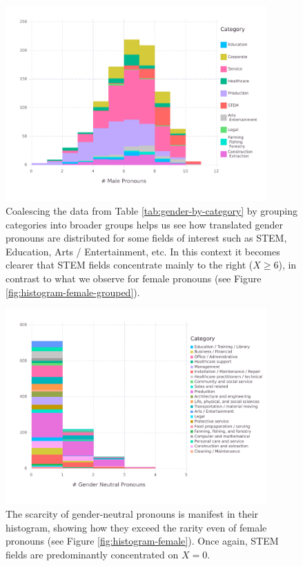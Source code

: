 \documentclass[fleqn,10pt]{article}
\begin{document}
\begin{figure}[H]
	\centering
	\includegraphics[width=10cm]{pictures/histogram-male-grouped}
	\caption{Coalescing the data from Table \ref{tab:gender-by-category} by grouping categories into broader groups helps us see how translated gender pronouns are distributed for some fields of interest such as STEM, Education, Arts / Entertainment, etc. In this context it becomes clearer that STEM fields concentrate mainly to the right ($X \geq 6$), in contrast to what we observe for female pronouns (see Figure \ref{fig:histogram-female-grouped}).}
	\label{fig:histogram-male-grouped}
\end{figure}

\begin{figure}[H]
	\centering
	\includegraphics[width=10cm]{pictures/histogram-neutral}
	\caption{The scarcity of gender-neutral pronouns is manifest in their histogram, showing how they exceed the rarity even of female pronouns (see Figure \ref{fig:histogram-female}). Once again, STEM fields are predominantly concentrated on $X = 0$.}
	\label{fig:histogram-neutral}
\end{figure}
\end{document}
